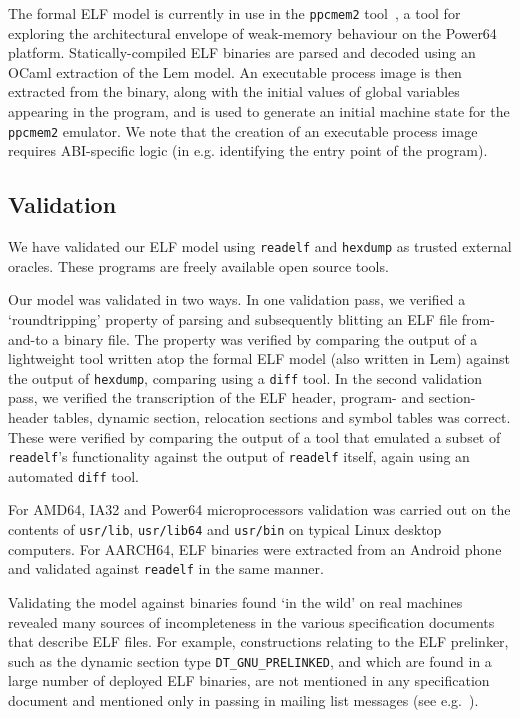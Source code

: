 The formal ELF model is currently in use in the \texttt{ppcmem2} tool~\cite{gray-integrated-2015}, a tool for exploring the architectural envelope of weak-memory behaviour on the Power64 platform.
Statically-compiled ELF binaries are parsed and decoded using an OCaml extraction of the Lem model.
An executable process image is then extracted from the binary, along with the initial values of global variables appearing in the program, and is used to generate an initial machine state for the \texttt{ppcmem2} emulator.
We note that the creation of an executable process image requires ABI-specific logic (in e.g. identifying the entry point of the program).

\subsection{Validation}
\label{subsect.elf.validation}

We have validated our ELF model using \texttt{readelf} and \texttt{hexdump} as trusted external oracles.
These programs are freely available open source tools.

Our model was validated in two ways.
In one validation pass, we verified a `roundtripping' property of parsing and subsequently blitting an ELF file from-and-to a binary file.
The property was verified by comparing the output of a lightweight tool written atop the formal ELF model (also written in Lem) against the output of \texttt{hexdump}, comparing using a \texttt{diff} tool.
In the second validation pass, we verified the transcription of the ELF header, program- and section-header tables, dynamic section, relocation sections and symbol tables was correct.
These were verified by comparing the output of a tool that emulated a subset of \texttt{readelf}'s functionality against the output of \texttt{readelf} itself, again using an automated \texttt{diff} tool.

For AMD64, IA32 and Power64 microprocessors validation was carried out on the contents of \texttt{usr/lib}, \texttt{usr/lib64} and \texttt{usr/bin} on typical Linux desktop computers.
For AARCH64, ELF binaries were extracted from an Android phone and validated against \texttt{readelf} in the same manner.

Validating the model against binaries found `in the wild' on real machines revealed many sources of incompleteness in the various specification documents that describe ELF files.
For example, constructions relating to the ELF prelinker, such as the dynamic section type \texttt{DT\_GNU\_PRELINKED}, and which are found in a large number of deployed ELF binaries, are not mentioned in any specification document and mentioned only in passing in mailing list messages (see e.g.~\cite{jelinek-prelinker-2001}).

